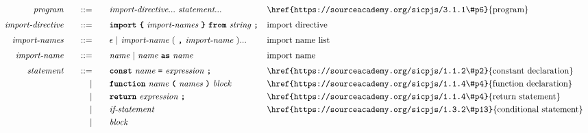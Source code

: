 \begin{alignat*}{9}
&& \textit{program}    &&\quad ::= &\quad && \textit{import-directive} ... \ \textit{statement} ...
                                                           && \textrm{\href{https://sourceacademy.org/sicpjs/3.1.1\#p6}{program}} \\[1mm]
&& \textit{import-directive}    &&\quad ::= &\quad && \textbf{\texttt{import}}\ \textbf{\texttt{\{}}\ \textit{import-names} \ \textbf{\texttt{\}}}\ \textbf{\texttt{from}}\  \textit{string} \ \textbf{\texttt{;}}
                                                           && \textrm{import directive} \\[1mm]
&& \textit{import-names}   && ::= &\quad &&  \epsilon\ | \  \textit{import-name} \ 
                                                   (\ \textbf{\texttt{,}} \ \textit{import-name}\ ) ...
                                                            && \textrm{import name list}   \\[1mm]
&& \textit{import-name}   && ::= &\quad &&  \textit{name}\ | \  \textit{name} \ \textbf{\texttt{as}}\ \textit{name} 
                                                            && \textrm{import name}   \\[1mm]
&& \textit{statement}    &&\quad ::= &\quad && \textbf{\texttt{const}}\  \textit{name} \ 
                                           \textbf{\texttt{=}}\  \textit{expression} \ \textbf{\texttt{;}}
                                                           && \textrm{\href{https://sourceacademy.org/sicpjs/1.1.2\#p2}{constant declaration}} \\
&&                       && |   &\quad && \textbf{\texttt{function}}\  \textit{name} \ 
                                   \textbf{\texttt{(}}\  \textit{names} \ \textbf{\texttt{)}}\ \textit{block} \quad
                                                           && \textrm{\href{https://sourceacademy.org/sicpjs/1.1.4\#p4}{function declaration}}\\
&&                       && |   &\quad && \textbf{\texttt{return}}\  \textit{expression} \ \textbf{\texttt{;}}
                                                           && \textrm{\href{https://sourceacademy.org/sicpjs/1.1.4\#p4}{return statement}}\\
&&                       && |   &\quad && \textit{if-statement} \quad
                                                           && \textrm{\href{https://sourceacademy.org/sicpjs/1.3.2\#p13}{conditional statement}}\\
&&                       && |   &\quad &&  \textit{block} 

\end{alignat*}
